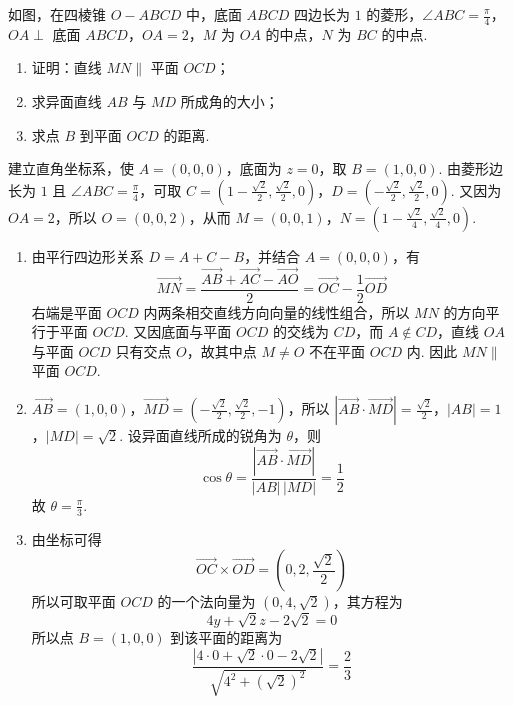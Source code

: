 \begin{problem}
如图，在四棱锥 \(O - ABCD\) 中，底面 \(ABCD\) 四边长为 \(1\) 的菱形，\(\angle ABC = \frac{\pi}{4}\)，\(OA \perp\) 底面 \(ABCD\)，\(OA = 2\)，\(M\) 为 \(OA\) 的中点，\(N\) 为 \(BC\) 的中点.

\begin{enumerate}
\item 证明：直线 \(MN \parallel\) 平面 \(OCD\)；
\item 求异面直线 \(AB\) 与 \(MD\) 所成角的大小；
\item 求点 \(B\) 到平面 \(OCD\) 的距离.
\end{enumerate}

\end{problem}

\begin{solution}
建立直角坐标系，使 \(A=(0,0,0)\)，底面为 \(z=0\)，取 \(B=(1,0,0)\). 由菱形边长为 \(1\) 且 \(\angle ABC=\frac\pi4\)，可取
\(C=\left(1-\frac{\sqrt2}{2},\frac{\sqrt2}{2},0\right)\)，\(D=\left(-\frac{\sqrt2}{2},\frac{\sqrt2}{2},0\right)\).
又因为 \(OA=2\)，所以 \(O=(0,0,2)\)，从而
\(M=(0,0,1)\)，\(N=\left(1-\frac{\sqrt2}{4},\frac{\sqrt2}{4},0\right)\).

\begin{enumerate}
\item
由平行四边形关系 \(D=A+C-B\)，并结合 \(A=(0,0,0)\)，有
\[
\overrightarrow{MN}=\frac{\overrightarrow{AB}+\overrightarrow{AC}-\overrightarrow{AO}}2
=\overrightarrow{OC}-\frac12\overrightarrow{OD}
\]
右端是平面 \(OCD\) 内两条相交直线方向向量的线性组合，所以 \(MN\) 的方向平行于平面 \(OCD\). 又因底面与平面 \(OCD\) 的交线为 \(CD\)，而 \(A\notin CD\)，直线 \(OA\) 与平面 \(OCD\) 只有交点 \(O\)，故其中点 \(M\ne O\) 不在平面 \(OCD\) 内. 因此 \(MN\parallel\) 平面 \(OCD\).

\item
\(\overrightarrow{AB}=(1,0,0)\)，\(\overrightarrow{MD}=\left(-\frac{\sqrt2}{2},\frac{\sqrt2}{2},-1\right)\)，所以
\(\left|\overrightarrow{AB}\cdot\overrightarrow{MD}\right|=\frac{\sqrt2}{2}\)，\(|AB|=1\)，\(|MD|=\sqrt2\).
设异面直线所成的锐角为 \(\theta\)，则
\[
\cos\theta=\frac{\left|\overrightarrow{AB}\cdot\overrightarrow{MD}\right|}{|AB|\,|MD|}=\frac12
\]
故 \(\theta=\frac\pi3\).

\item
	由坐标可得
	\[
	\overrightarrow{OC}\times\overrightarrow{OD}=\left(0,2,\frac{\sqrt2}{2}\right)
	\]
	所以可取平面 \(OCD\) 的一个法向量为 \((0,4,\sqrt2)\)，其方程为
	\[
	4y+\sqrt2z-2\sqrt2=0
	\]
	所以点 \(B=(1,0,0)\) 到该平面的距离为
	\[
	\frac{|4\cdot0+\sqrt2\cdot0-2\sqrt2|}{\sqrt{4^2+(\sqrt2)^2}}=\frac23
	\]
\end{enumerate}
\end{solution}

